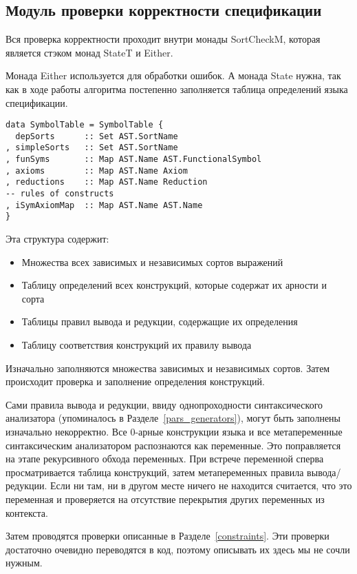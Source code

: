 \subsection{Модуль проверки корректности спецификации}\label{sortcheck}
Вся проверка корректности проходит внутри монады SortCheckM, которая является стэком монад StateT и Either.

Монада Either используется для обработки ошибок. А монада State нужна, так как в ходе работы алгоритма постепенно заполняется таблица определений языка спецификации.

\begin{lstlisting}[caption={Структура заполняемая модулем проверки спецификации},captionpos=b,frame=single, label={SymTab}]
data SymbolTable = SymbolTable {
  depSorts      :: Set AST.SortName
, simpleSorts   :: Set AST.SortName
, funSyms       :: Map AST.Name AST.FunctionalSymbol
, axioms        :: Map AST.Name Axiom
, reductions    :: Map AST.Name Reduction
-- rules of constructs
, iSymAxiomMap  :: Map AST.Name AST.Name
}
\end{lstlisting}

Эта структура содержит:
\begin{itemize}
\item Множества всех зависимых и независимых сортов выражений
\item Таблицу определений всех конструкций, которые содержат их арности и сорта
\item Таблицы правил вывода и редукции, содержащие их определения
\item Таблицу соответствия конструкций их правилу вывода
\end{itemize}

Изначально заполняются множества зависимых и независимых сортов. Затем происходит проверка и заполнение определения конструкций.

Сами правила вывода и редукции, ввиду однопроходности синтаксического анализатора (упоминалось в Разделе~\ref{pars_generators}), могут быть заполнены изначально некорректно. Все 0-арные конструкции языка и все метапеременные синтаксическим анализатором распознаются как переменные. Это поправляется на этапе рекурсивного обхода переменных. При встрече переменной сперва просматривается таблица конструкций, затем метапеременных правила вывода/редукции. Если ни там, ни в другом месте ничего не находится считается, что это переменная и проверяется на отсутствие перекрытия других переменных из контекста.

Затем проводятся проверки описанные в Разделе~\ref{constraints}. Эти проверки достаточно очевидно переводятся в код, поэтому описывать их здесь мы не сочли нужным.




















